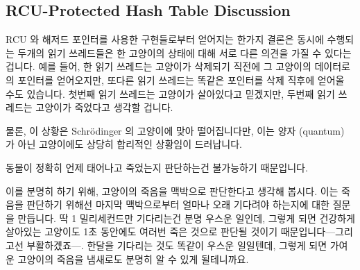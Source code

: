 \subsection{RCU-Protected Hash Table Discussion}
\label{sec:datastruct:RCU-Protected Hash Table Discussion}

RCU 와 해저드 포인터를 사용한 구현들로부터 얻어지는 한가지 결론은 동시에
수행되는 두개의 읽기 쓰레드들은 한 고양이의 상태에 대해 서로 다른 의견을 가질
수 있다는 겁니다.
예를 들어, 한 읽기 쓰레드는 고양이가 삭제되기 직전에 그 고양이의 데이터로의
포인터를 얻어오지만, 또다른 읽기 쓰레드는 똑같은 포인터를 삭제 직후에 얻어올
수도 있습니다.
첫번째 읽기 쓰레드는 고양이가 살아있다고 믿겠지만, 두번째 읽기 쓰레드는
고양이가 죽었다고 생각할 겁니다.

물론, 이 상황은 Schr\"odinger 의 고양이에 맞아 떨어집니다만, 이는 양자
(quantum) 가 아닌 고양이에도 상당히 합리적인 상황임이 드러납니다.

동물이 정확히 언제 태어나고 죽었는지 판단하는건 불가능하기 때문입니다.

이를 분명히 하기 위해, 고양이의 죽음을 맥박으로 판단한다고 생각해 봅시다.
이는 죽음을 판단하기 위해선 마지막 맥박으로부터 얼마나 오래 기다려야 하는지에
대한 질문을 만듭니다.
딱 1 밀리세컨드만 기다리는건 분명 우스운 일인데, 그렇게 되면 건강하게 살아있는
고양이도 1초 동안에도 여러번 죽은 것으로 판단될 것이기 때문입니다---그리고선
부활하겠죠---.
한달을 기다리는 것도 똑같이 우스운 일일텐데, 그렇게 되면 가여운 고양이의 죽음을
냄새로도 분명히 알 수 있게 될테니까요.

